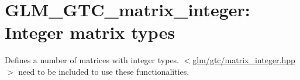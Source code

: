 \hypertarget{group__gtc__matrix__integer}{\section{\-G\-L\-M\-\_\-\-G\-T\-C\-\_\-matrix\-\_\-integer\-: \-Integer matrix types}
\label{group__gtc__matrix__integer}
}
\-Defines a number of matrices with integer types. $<$\hyperlink{matrix__integer_8hpp}{glm/gtc/matrix\-\_\-integer.\-hpp}$>$ need to be included to use these functionalities. 